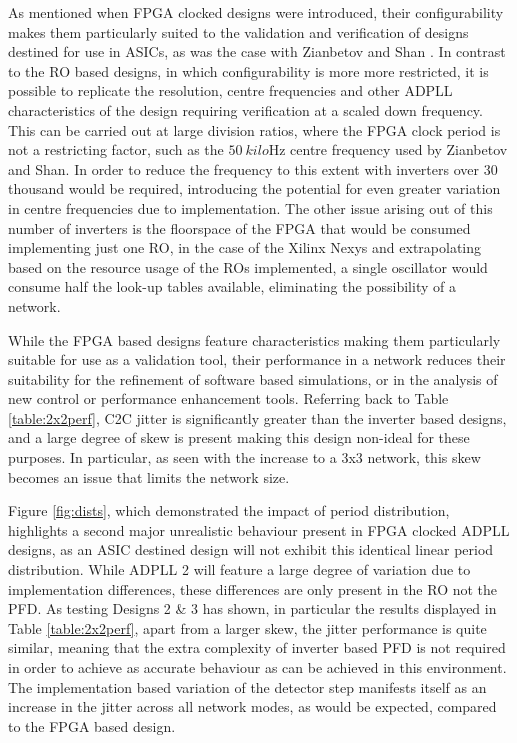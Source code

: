 As mentioned when \ac{FPGA} clocked designs were introduced, their configurability makes them particularly suited to the validation and verification of designs destined for use in \ac{ASIC}s, as was the case with Zianbetov and Shan \cite{zianbetov2013phd,shan2014phd}. In contrast to the \ac{RO} based designs, in which configurability is more more restricted, it is possible to replicate the resolution, centre frequencies and other \ac{ADPLL} characteristics of the design requiring verification at a scaled down frequency. This can be carried out at large division ratios, where the \ac{FPGA} clock period is not a restricting factor, such as the $50~\si{kilo\hertz}$ centre frequency used by Zianbetov and Shan. In order to reduce the frequency to this extent with inverters over $30$ thousand would be required, introducing the potential for even greater variation in centre frequencies due to implementation. The other issue arising out of this number of inverters is the floorspace of the \ac{FPGA} that would be consumed implementing just one \ac{RO}, in the case of the Xilinx \acl{Nexys} and extrapolating based on the resource usage of the \ac{RO}s implemented, a single oscillator would consume half the look-up tables available, eliminating the possibility of a network.

While the \ac{FPGA} based designs feature characteristics making them particularly suitable for use as a validation tool, their performance in a network reduces their suitability for the refinement of software based simulations, or in the analysis of new control or performance enhancement tools. Referring back to Table \ref{table:2x2perf}, \ac{C2C} jitter is significantly greater than the inverter based designs, and a large degree of skew is present making this design non-ideal for these purposes. In particular, as seen with the increase to a 3x3 network, this skew becomes an issue that limits the network size.

Figure \ref{fig:dists}, which demonstrated the impact of period distribution, highlights a second major unrealistic behaviour present in \ac{FPGA} clocked \ac{ADPLL} designs, as an \ac{ASIC} destined design will not exhibit this identical linear period distribution. While \ac{ADPLL} 2 will feature a large degree of variation due to implementation differences, these differences are only present in the \ac{RO} not the \ac{PFD}. As testing Designs 2 \& 3 has shown, in particular the results displayed in Table \ref{table:2x2perf}, apart from a larger skew, the jitter performance is quite similar, meaning that the extra complexity of inverter based \ac{PFD} is not required in order to achieve as accurate behaviour as can be achieved in this environment. The implementation based variation of the detector step manifests itself as an increase in the jitter across all network modes, as would be expected, compared to the \ac{FPGA} based design.

